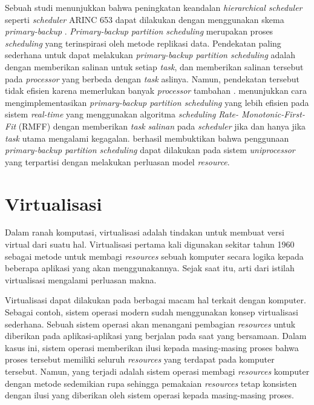 Sebuah studi menunjukkan bahwa peningkatan keandalan \textit{hierarchical scheduler} seperti
\textit{scheduler} ARINC 653 dapat dilakukan dengan menggunakan skema \textit{primary-backup}
\citep{Hyun2012}. \textit{Primary-backup partition scheduling} merupakan proses
\textit{scheduling} yang terinspirasi oleh metode replikasi data. Pendekatan paling sederhana
untuk dapat melakukan \textit{primary-backup partition scheduling} adalah dengan memberikan salinan
untuk setiap \textit{task}, dan memberikan salinan tersebut pada \textit{processor} yang berbeda
dengan \textit{task} aslinya.  Namun, pendekatan tersebut tidak efisien karena memerlukan banyak
\textit{processor} tambahan \citep{Oh1994}.  \citet{Bertossi2006} menunjukkan cara
mengimplementasikan \textit{primary-backup partition scheduling} yang lebih efisien pada sistem
\textit{real-time} yang menggunakan algoritma \textit{scheduling} \textit{Rate-
Monotonic-First-Fit} (RMFF) dengan memberikan \textit{task} \textit{salinan} pada
\textit{scheduler} jika dan hanya jika \textit{task} utama mengalami kegagalan.  \citet{Jin2013}
berhasil membuktikan bahwa penggunaan \textit{primary-backup partition scheduling} dapat
dilakukan pada sistem \textit{uniprocessor} yang terpartisi dengan melakukan perluasan model
\textit{resource}.

\section{Virtualisasi}

Dalam ranah komputasi, virtualisasi adalah tindakan untuk membuat versi virtual dari suatu hal.
Virtualisasi pertama kali digunakan sekitar tahun 1960 sebagai metode untuk membagi
\textit{resources} sebuah komputer secara logika kepada beberapa aplikasi yang akan
menggunakannya.  Sejak saat itu, arti dari istilah virtualisasi mengalami perluasan makna.

Virtualisasi dapat dilakukan pada berbagai macam hal terkait dengan komputer.  Sebagai contoh,
sistem operasi modern sudah menggunakan konsep virtualisasi sederhana.  Sebuah sistem operasi
akan menangani pembagian \textit{resources} untuk diberikan pada aplikasi-aplikasi yang
berjalan pada saat yang bersamaan. Dalam kasus ini, sistem operasi memberikan ilusi kepada
masing-masing proses bahwa proses tersebut memiliki seluruh \textit{resources} yang terdapat
pada komputer tersebut. Namun, yang terjadi adalah sistem operasi membagi \textit{resources}
komputer dengan metode sedemikian rupa sehingga pemakaian \textit{resources} tetap konsisten
dengan ilusi yang diberikan oleh sistem operasi kepada masing-masing proses.

